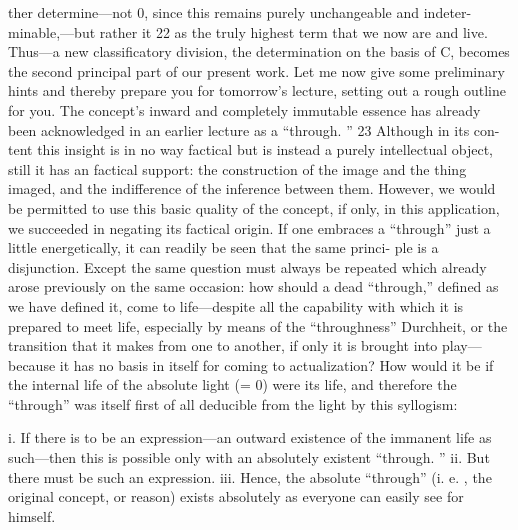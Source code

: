 ther determine—not 0, since this remains purely unchangeable and indeter-
minable,—but rather it 22 as the truly highest term that we now are and live.
Thus—a new classificatory division, the determination on the basis of C,
becomes the second principal part of our present work.
Let me now give some preliminary hints and thereby prepare you for
tomorrow’s lecture, setting out a rough outline for you.
The concept’s inward and completely immutable essence has already
been acknowledged in an earlier lecture as a “through.
” 23 Although in its con-
tent this insight is in no way factical but is instead a purely intellectual object,
still it has an factical support: the construction of the image and the thing
imaged, and the indifference of the inference between them.
 However, we
would be permitted to use this basic quality of the concept, if only, in this
application, we succeeded in negating its factical origin.
 If one embraces a
“through” just a little energetically, it can readily be seen that the same princi-
ple is a disjunction.
 Except the same question must always be repeated which
already arose previously on the same occasion: how should a dead “through,”
defined as we have defined it, come to life—despite all the capability with
which it is prepared to meet life, especially by means of the “throughness”
{Durchheit}, or the transition that it makes from one to another, if only it is
brought into play—because it has no basis in itself for coming to actualization?
 How would it be if the internal life of the absolute light (= 0) were its
life, and therefore the “through” was itself first of all deducible from the light
by this syllogism:

i.
 If there is to be an expression—an outward existence of the immanent life
as such—then this is possible only with an absolutely existent “through.
”
ii.
 But there must be such an expression.
iii.
 Hence, the absolute “through” (i.
e.
, the original concept, or reason) exists
absolutely as everyone can easily see for himself.

